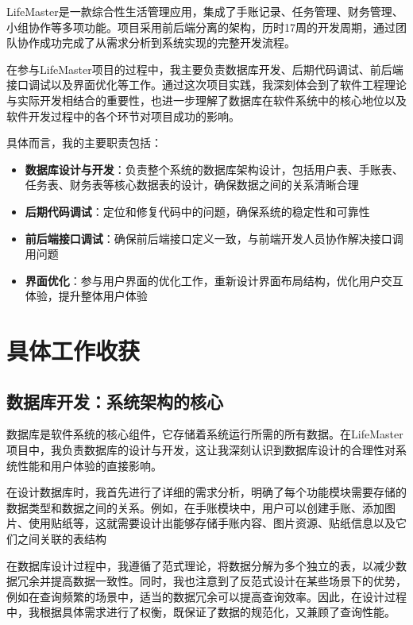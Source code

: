 \documentclass[a4paper]{article}
\begin{document}
LifeMaster是一款综合性生活管理应用，集成了手账记录、任务管理、财务管理、小组协作等多项功能。项目采用前后端分离的架构，历时17周的开发周期，通过团队协作成功完成了从需求分析到系统实现的完整开发流程。

在参与LifeMaster项目的过程中，我主要负责数据库开发、后期代码调试、前后端接口调试以及界面优化等工作。通过这次项目实践，我深刻体会到了软件工程理论与实际开发相结合的重要性，也进一步理解了数据库在软件系统中的核心地位以及软件开发过程中的各个环节对项目成功的影响。

具体而言，我的主要职责包括：

\begin{itemize}
    \item \textbf{数据库设计与开发}：负责整个系统的数据库架构设计，包括用户表、手账表、任务表、财务表等核心数据表的设计，确保数据之间的关系清晰合理
    \item \textbf{后期代码调试}：定位和修复代码中的问题，确保系统的稳定性和可靠性
    \item \textbf{前后端接口调试}：确保前后端接口定义一致，与前端开发人员协作解决接口调用问题
    \item \textbf{界面优化}：参与用户界面的优化工作，重新设计界面布局结构，优化用户交互体验，提升整体用户体验
\end{itemize}

\section{具体工作收获}

\subsection{数据库开发：系统架构的核心}

数据库是软件系统的核心组件，它存储着系统运行所需的所有数据。在LifeMaster项目中，我负责数据库的设计与开发，这让我深刻认识到数据库设计的合理性对系统性能和用户体验的直接影响。

在设计数据库时，我首先进行了详细的需求分析，明确了每个功能模块需要存储的数据类型和数据之间的关系。例如，在手账模块中，用户可以创建手账、添加图片、使用贴纸等，这就需要设计出能够存储手账内容、图片资源、贴纸信息以及它们之间关联的表结构

在数据库设计过程中，我遵循了范式理论，将数据分解为多个独立的表，以减少数据冗余并提高数据一致性。同时，我也注意到了反范式设计在某些场景下的优势，例如在查询频繁的场景中，适当的数据冗余可以提高查询效率。因此，在设计过程中，我根据具体需求进行了权衡，既保证了数据的规范化，又兼顾了查询性能。
\end{document}
